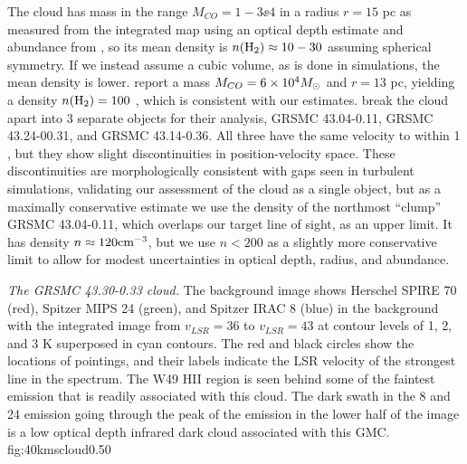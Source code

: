 % 
% 
The cloud has mass in the range $M_{CO} = 1-3\ee{4}$ \msun in a radius $r=15$ pc as measured
from the integrated \thirteenco map using an optical depth estimate and
abundance from \citet{Roman-Duval2010a}, so its mean density is $n(\textrm{H}_{2}) \approx
10-30$ \percc assuming spherical symmetry.  If we
instead assume a cubic volume, as is done in simulations, the mean density is lower. 
\citet{Simon2001a} report a mass $M_{CO} = 6\times10^{4} M_{\odot}$ and $r=13$ pc,
yielding a density $n(\textrm{H}_{2})=100$ \percc, which is consistent with our estimates.
\citet{Roman-Duval2010a} break the cloud apart into 3 separate objects for their
analysis, GRSMC 43.04-0.11, GRSMC 43.24-00.31, and GRSMC 43.14-0.36.  All three
have the same velocity to within 1 \kms, but they show slight discontinuities
in position-velocity space.  These discontinuities are morphologically consistent
with gaps seen in turbulent simulations, validating our assessment of the cloud as a
single object, but as a maximally conservative estimate we use the density of the
northmost ``clump'' GRSMC 43.04-0.11, which overlaps our target line of sight,
as an upper limit.  It has density $n\approx120\textrm{cm}^{-3}$, but we use $n<200$ \percc
as a slightly more conservative limit to allow for modest uncertainties in
optical depth, radius, and abundance.




{\textit{The GRSMC 43.30-0.33 cloud.}  The background image shows Herschel SPIRE 70 \um (red),
Spitzer MIPS 24 \um (green), and Spitzer IRAC 8 \um (blue) in the background with
the \thirteenco integrated image from $v_{LSR}=36$ \kms to $v_{LSR}=43$ \kms at contour levels of
1, 2, and 3 K \kms superposed in cyan contours.  The red and black circles
show the locations of \formaldehyde pointings, and their labels indicate the LSR velocity
of the strongest line in the spectrum.  The W49 HII region is seen
behind some of the faintest \thirteenco emission that is readily associated
with this cloud.  The dark swath in the 8 and 24 \um emission going through the
peak of the \thirteenco emission in the lower half of the image is a low
optical depth infrared dark cloud associated with this GMC.}
{fig:40kmscloud}{0.5}{0}

